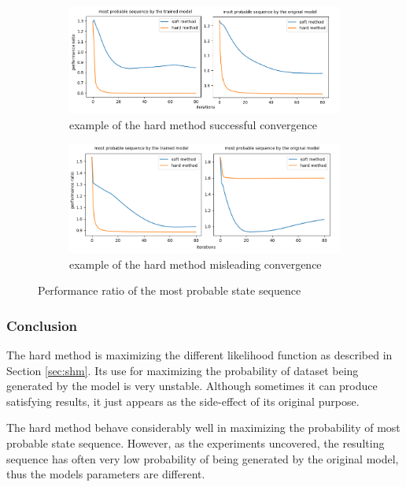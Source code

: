 \documentclass[thesis=M,english]{FITthesis}[2012/10/20]
\begin{document}
\begin{figure}
\centering
\begin{subfigure}{1.1\textwidth}
  \centering
  \includegraphics[width=1\linewidth]{img/ex4/hard_good.png}
  \caption{example of the hard method successful convergence}
  \label{fig:vit_good}
\end{subfigure}
\begin{subfigure}{1.1\textwidth}
  \centering
  \includegraphics[width=1\linewidth]{img/ex4/hard_bad.png}
  \caption{example of the hard method misleading convergence}
  \label{fig:vit_bad}
\end{subfigure}
\caption{Performance ratio of the most probable state sequence }
\label{fig:vit_all}
\end{figure}

\subsubsection*{ Conclusion }
The hard method is maximizing the different likelihood function as described in Section \ref{sec:shm}. Its use for maximizing the probability of dataset being generated by the model is very unstable. Although sometimes it can produce satisfying results, it just appears as the side-effect of its original purpose.

The hard method behave considerably well in maximizing the probability of most probable state sequence. However, as the experiments uncovered, the resulting sequence has often very low probability of being generated by the original model, thus the models parameters are different.    
\end{document}
